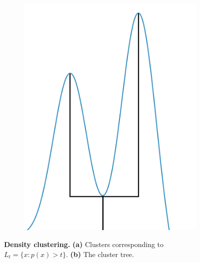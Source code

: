 \begin{figure}[h]
\begin{subfigure}{.5\columnwidth}
    \includegraphics[width=\columnwidth]{main_figures/intro/density_tree.png}
    \caption{}
    \label{fig:tree}
\end{subfigure}
\caption[Density clustering]{\textbf{Density clustering.} \textbf{(a)} Clusters corresponding to $L_{t} = \{x : p(x) > t\}$. \textbf{(b)} The cluster tree. }
\label{fig:density_clustering}
\end{figure}


